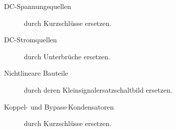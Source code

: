 \begin{description}
    \item[DC-Spannungsquellen] durch Kurzschlüsse ersetzen.
    \item[DC-Stromquellen] durch Unterbrüche ersetzen. 
    \item[Nichtlineare Bauteile] durch deren Kleinsignalersatzschaltbild ersetzen.
    \item[Koppel- und Bypass-Kondensatoren] durch Kurzschlüsse ersetzen.  
\end{description}

